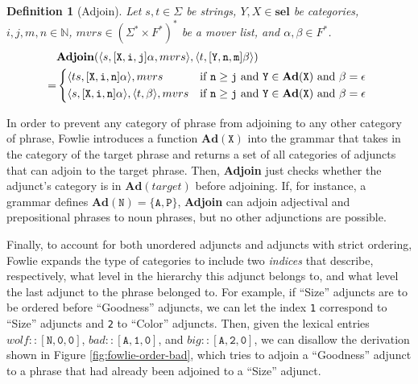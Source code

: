 \documentclass{article}
\newtheorem{mydef}{Definition}
\begin{document}
\begin{mydef}[Adjoin]
\label{def:adjoin}
  Let $s,t \in \Sigma$ be strings, $Y,X \in \mathbf{sel}$ be
  categories, $i, j, m, n \in \mathbb{N}$,
  $mvrs \in (\Sigma^{*} \times F^{*})^{*}$ be a mover list, and
  $\alpha, \beta \in F^{*}$.
  \begin{align*}
    & \mathbf{Adjoin}(
      \langle s, [\mathtt{X}, \mathtt{i}, \mathtt{j}]\alpha, mvrs \rangle,
      \langle t, [\mathtt{Y}, \mathtt{n}, \mathtt{m}]\beta \rangle
      ) \\
    = &\begin{dcases*}
      \langle ts, [\mathtt{X}, \mathtt{i}, \mathtt{n}]\alpha \rangle, mvrs
      & if $\mathtt{n} \geq \mathtt{j}$ and $\mathtt{Y} \in \mathbf{Ad}(\mathtt{X})$ and $\beta = \epsilon$ \\
      \langle s, [\mathtt{X}, \mathtt{i}, \mathtt{n}]\alpha \rangle, \langle t, \beta \rangle, mvrs
      & if $\mathtt{n} \geq \mathtt{j}$ and $\mathtt{Y} \in \mathbf{Ad}(\mathtt{X})$ and $\beta = \epsilon$
    \end{dcases*}
  \end{align*}
\end{mydef}

In order to prevent any category of phrase from adjoining to any other
category of phrase, Fowlie introduces a function
$\mathbf{Ad}(\mathtt{X})$ into the grammar that takes in the category
of the target phrase and returns a set of all categories of adjuncts
that can adjoin to the target phrase.  Then, \textbf{Adjoin} just
checks whether the adjunct's category is in $\mathbf{Ad}(target)$
before adjoining.  If, for instance, a grammar defines
$\mathbf{Ad}(\mathtt{N}) = \{ \mathtt{A, P} \}$, \textbf{Adjoin} can
adjoin adjectival and prepositional phrases to noun phrases, but no
other adjunctions are possible.

Finally, to account for both unordered adjuncts and adjuncts with
strict ordering, Fowlie expands the type of categories to include two
\textit{indices} that describe, respectively, what level in the
hierarchy this adjunct belongs to, and what level the last adjunct to
the phrase belonged to.  For example, if ``Size'' adjuncts are to be
ordered before ``Goodness'' adjuncts, we can let the index \texttt{1}
correspond to ``Size'' adjuncts and \texttt{2} to ``Color'' adjuncts.
Then, given the lexical entries
$\textit{wolf} :: [\mathtt{N}, \mathtt{0}, \mathtt{0}]$,
$\textit{bad} :: [\mathtt{A}, \mathtt{1}, \mathtt{0}]$, and
$\textit{big} :: [\mathtt{A}, \mathtt{2}, \mathtt{0}]$, we can
disallow the derivation shown in Figure \ref{fig:fowlie-order-bad},
which tries to adjoin a ``Goodness'' adjunct to a phrase that had
already been adjoined to a ``Size'' adjunct.
\end{document}
